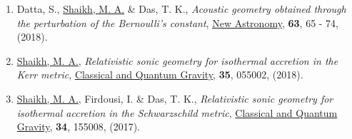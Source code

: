 \begin{enumerate}
\item Datta, S., \underline{Shaikh, M. A.} \& Das, T. K., {\itshape Acoustic geometry obtained through the perturbation of the Bernoulli's constant}, \href{http://www.sciencedirect.com/science/article/pii/S1384107617301847}{{New Astronomy}}, {\bfseries 63}, 65 - 74, (2018).
\item \underline{Shaikh, M. A.}, {\itshape Relativistic sonic geometry for isothermal accretion in the Kerr metric}, \href{https://doi.org/10.1088%2F1361-6382%2Faaa5cd}{{Classical and Quantum Gravity}}, {\bfseries 35}, 055002, (2018).
\item \underline{Shaikh, M. A.}, Firdousi, I. \& Das, T. K., {\itshape Relativistic sonic geometry for isothermal accretion in the Schwarzschild metric}, \href{https://doi.org/10.1088%2F1361-6382%2Faa7b19}{{Classical and Quantum Gravity}}, {\bfseries 34}, 155008, (2017).
\end{enumerate}

